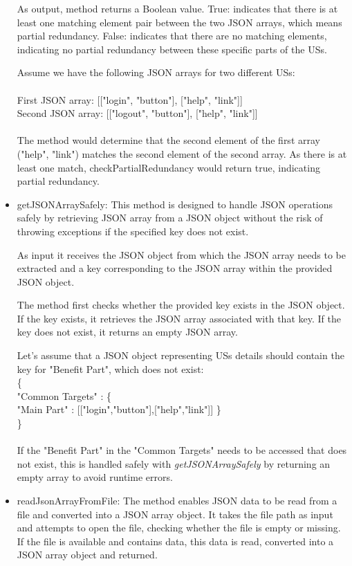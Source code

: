 \begin{itemize}
	As output, method returns a Boolean value. True: indicates that there is at least one matching element pair between the two JSON arrays, which means partial redundancy. False: indicates that there are no matching elements, indicating no partial redundancy between these specific parts of the USs.
	
	\begin{example} Assume we have the following JSON arrays for two different USs: \\\\
		First JSON array: [["login", "button"], ["help", "link"]]\\
		Second JSON array:	[["logout", "button"], ["help", "link"]]\\\\
		The method would determine that the second element of the first array ("help", "link") matches the second element of the second array. As there is at least one match, checkPartialRedundancy would return true, indicating partial redundancy.
	\end{example}
	
	
	\item getJSONArraySafely: This method is designed to handle JSON operations safely by retrieving JSON array from a JSON object without the risk of throwing exceptions if the specified key does not exist.
	
	As input it receives the JSON object from which the JSON array needs to be extracted and a key corresponding to the JSON array within the provided JSON object.
	
	The method first checks whether the provided key exists in the JSON object. If the key exists, it retrieves the JSON array associated with that key. If the key does not exist, it returns an empty JSON array.
	\begin{example} Let's assume that a JSON object representing USs details should contain the key for "Benefit Part", which does not exist:\\
		\{\\
		"Common Targets" : \{\\
		"Main Part" : [["login","button"],["help","link"]]
		\}\\
		\} \\\\
		If the "Benefit Part" in the "Common Targets" needs to be accessed that does not exist, this is handled safely with \textit{getJSONArraySafely} by returning an empty array to avoid runtime errors.
	\end{example}
	
	\item readJsonArrayFromFile: The method enables JSON data to be read from a file and converted into a JSON array object. It takes the file path as input and attempts to open the file, checking whether the file is empty or missing. If the file is available and contains data, this data is read, converted into a JSON array object and returned.
	
\end{itemize}
